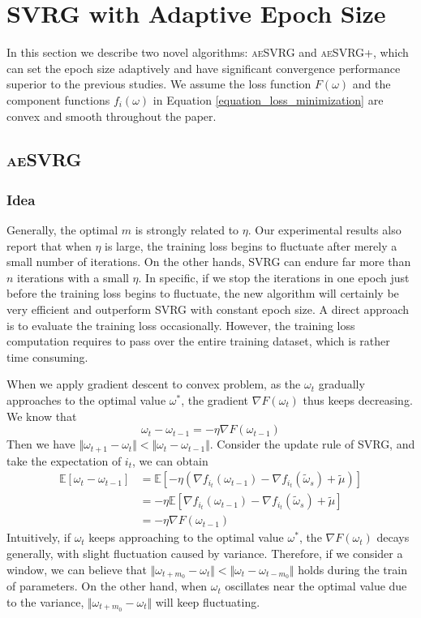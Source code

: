\documentclass[conference]{IEEEtran}
\begin{document}
 \section{SVRG with Adaptive Epoch Size}
 \label{mywork}
 In this section we describe two novel algorithms: \textsc{aeSVRG} and \textsc{aeSVRG+}, which can set the epoch size adaptively and have significant convergence performance superior to the previous studies.
 We assume the loss function $F(\omega)$ and the component functions $f_i(\omega)$ in Equation \ref{equation_loss_minimization} are convex and smooth throughout the paper.
 
 \subsection{\textsc{aeSVRG}}
 \subsubsection{Idea}
Generally, the optimal $m$ is strongly related to $\eta$. Our experimental results also report that when $\eta$ is large, the training loss begins to fluctuate after merely a small number of iterations. On the other hands, SVRG can endure far more than $n$ iterations with a small $\eta$. In specific, if we stop the iterations in one epoch just before the training loss begins to fluctuate, the new algorithm will certainly be very efficient and outperform SVRG with constant epoch size. A direct approach is to evaluate the training loss occasionally. However, the training loss computation requires to pass over the entire training dataset, which is rather time consuming. 

 When we apply gradient descent to convex problem, as the $\omega_t$ gradually approaches to the optimal value $\omega^*$, the gradient $\nabla F(\omega_t)$ thus keeps decreasing. We know that
 $$\omega_t - \omega_{t-1} = -\eta\nabla F(\omega_{t-1})$$
 Then we have $\Vert\omega_{t+1}-\omega_t\Vert<\Vert\omega_{t}-\omega_{t-1}\Vert$. 
Consider the update rule of SVRG, and take the expectation of $i_t$, we can obtain
 \begin{equation}
\label{sgdinequality}
\begin{split}
\mathbb{E}[\omega_t -\omega_{t-1}] &=  \mathbb{E}[- \eta(\nabla f_{i_t}(\omega_{t-1}) - \nabla f_{i_t}(\tilde{\omega}_s)+\tilde{\mu})]\\
&=-\eta\mathbb{E}[\nabla f_{i_t}(\omega_{t-1}) - \nabla f_{i_t}(\tilde{\omega}_s)+\tilde{\mu}]\\
&=-\eta\nabla F(\omega_{t-1})
\end{split}
\end{equation}
 Intuitively, if $\omega_t$ keeps approaching to the optimal value $\omega^*$, the $\nabla F(\omega_{t})$ decays generally, with slight fluctuation caused by variance. Therefore, if we consider a window, we can believe that $\Vert\omega_{t+m_0}-\omega_t\Vert<\Vert\omega_{t}-\omega_{t-m_0}\Vert$ holds  during the train of parameters.  
 On the other hand, when $\omega_t$ oscillates near the optimal value due to the variance, $\Vert\omega_{t+m_0}-\omega_t\Vert$ will keep fluctuating. 
\end{document}
